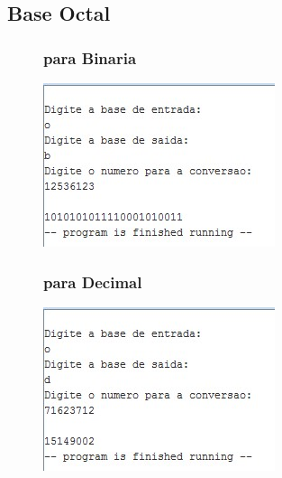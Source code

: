 \documentclass[10pt,a4paper]{article}
\begin{document}
\subsection{Base Octal}
\begin{figure}[H]
\begin{minipage}[t]{.5\textwidth}
\subsubsection{para Binaria}
\includegraphics[width=\textwidth]{OB.jpg}
\end{minipage}
\begin{minipage}[t]{.5\textwidth}
\subsubsection{para Decimal}
\includegraphics[width=\textwidth]{OD.jpg}
\end{minipage}
\begin{minipage}[t]{.5\textwidth}

\end{minipage}
\end{figure}
\end{document}
